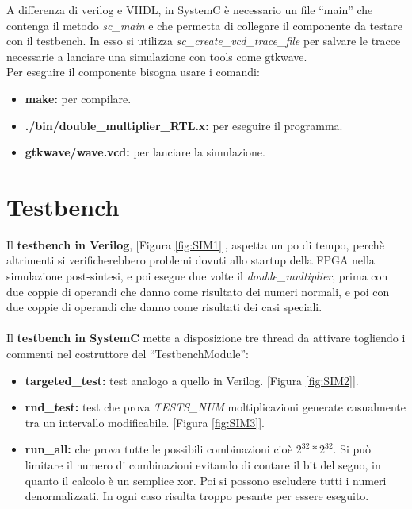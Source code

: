 \documentclass[]{IEEEtran}
\begin{document}
A differenza di verilog e VHDL, in SystemC è necessario un file ``main'' che contenga il metodo \textit{sc\_main} e che permetta di collegare il componente da testare con il testbench. In esso si utilizza \textit{sc\_create\_vcd\_trace\_file} per salvare le tracce necessarie a lanciare una simulazione con tools come gtkwave.
\\Per eseguire il componente bisogna usare i comandi:
\begin{itemize}
    \item \textbf{make: } per compilare.
    \item \textbf{./bin/double\_multiplier\_RTL.x:} per eseguire il programma.
    \item \textbf{gtkwave/wave.vcd:} per lanciare la simulazione.
\end{itemize}



\section{Testbench}
Il \textbf{testbench in Verilog}, [Figura \ref{fig:SIM1}], aspetta un po di tempo, perchè altrimenti si verificherebbero problemi dovuti allo startup della FPGA nella simulazione post-sintesi, e poi esegue due volte il \textit{double\_multiplier}, prima con due coppie di operandi che danno come risultato dei numeri normali, e poi con due coppie di operandi che danno come risultati dei casi speciali. \\\\


Il \textbf{testbench in SystemC} mette a disposizione tre thread da attivare togliendo i commenti nel costruttore del ``TestbenchModule'':
\begin{itemize}
    \item \textbf{targeted\_test:} test analogo a quello in Verilog. [Figura \ref{fig:SIM2}].
    \item \textbf{rnd\_test:} test che prova \textit{TESTS\_NUM} moltiplicazioni generate casualmente tra un intervallo modificabile. [Figura \ref{fig:SIM3}].
    \item \textbf{run\_all:} che prova tutte le possibili combinazioni cioè \(2^{32} * 2^{32}\). Si può limitare il numero di combinazioni evitando di contare il bit del segno, in quanto il calcolo è un semplice xor. Poi si possono escludere tutti i numeri denormalizzati. In ogni caso risulta troppo pesante per essere eseguito.
\end{itemize}
\end{document}
